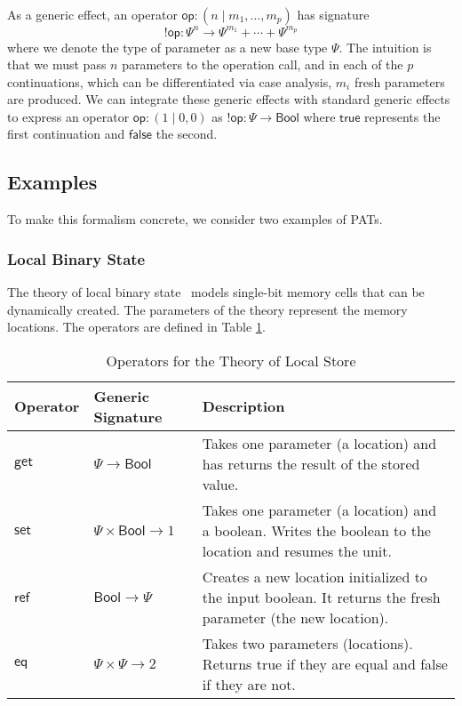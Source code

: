 \documentclass{article}
\theoremstyle{definition}
\theoremstyle{remark}
\newcommand\true{\mathsf{true}}
\newcommand\false{\mathsf{false}}
\newcommand\bool{\mathsf{Bool}}
\newcommand\op{\mathsf{op}}
\newcommand\get{\mathsf{get}}
\newcommand\set{\mathsf{set}}
\newcommand\newref{\mathsf{ref}}
\newcommand\eq{\mathsf{eq}}
\newcommand\eff{{!}}
\begin{document}
As a generic effect, an operator $\op: (n \mid m_1, \dots, m_p)$ has signature
\[
  \eff\op : \Psi^n \to \Psi^{m_1} + \cdots + \Psi^{m_p}
\]
where we denote the type of parameter as a new base type $\Psi$. The intuition is that we must pass $n$ parameters to the operation call, and in each of the $p$ continuations,
which can be differentiated via case analysis, $m_i$ fresh parameters are produced. We can integrate these generic effects with standard generic effects to express
an operator $\op : (1 \mid 0, 0)$ as $\eff\op: \Psi \to \bool$ where $\true$ represents the first continuation and $\false$ the second.

\subsection{Examples} \label{sec:examples}

To make this formalism concrete, we consider two examples of PATs.

\subsubsection{Local Binary State}

The theory of local binary state~\cite{staton_instances_2013} models single-bit memory cells that can be dynamically created.
The parameters of the theory represent the memory locations. The operators are defined in Table \ref{tab:localstore}.

\begin{table}[h]
  \centering
  \begin{tabular}{l l p{8cm}}
    \hline
    \textbf{Operator} & \textbf{Generic Signature} & \textbf{Description} \\
    \hline
    $\get$    & $\Psi \to \bool$          & Takes one parameter (a location) and has returns the result of the stored value. \\
    $\set$    & $\Psi \times \bool \to 1$ & Takes one parameter (a location) and a boolean. Writes the boolean to the location and resumes the unit. \\
    $\newref$ & $\bool \to \Psi$          & Creates a new location initialized to the input boolean. It returns the fresh parameter (the new location). \\
    $\eq$     & $\Psi\times \Psi \to 2$   & Takes two parameters (locations). Returns true if they are equal and false if they are not. \\
    \hline
  \end{tabular}
  \caption{Operators for the Theory of Local Store}
  \label{tab:localstore}
\end{table}
\end{document}
